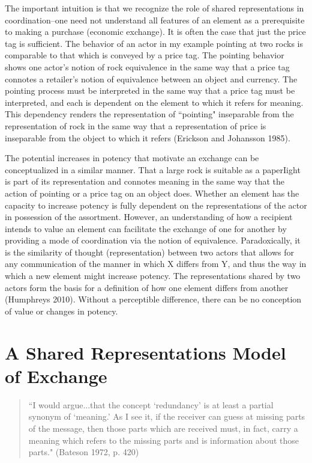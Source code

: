 The important intuition is that we recognize the role of shared representations in coordination--one need not understand all features of an element as a prerequisite to making a purchase (economic exchange). It is often the case that just the price tag is sufficient. The behavior of an actor in my example pointing at two rocks is comparable to that which is conveyed by a price tag. The pointing behavior shows one actor's notion of rock equivalence in the same way that a price tag connotes a retailer's notion of equivalence between an object and currency. The pointing process must be interpreted in the same way that a price tag must be interpreted, and each is dependent on the element to which it refers for meaning. This dependency renders the representation of ``pointing" inseparable from the representation of rock in the same way that a representation of price is inseparable from the object to which it refers (Erickson and Johansson 1985). 

The potential increases in potency that motivate an exchange can be conceptualized in a similar manner. That a large rock is suitable as a paperIight is part of its representation and connotes meaning in the same way that the action of pointing or a price tag on an object does. Whether an element has the capacity to increase potency is fully dependent on the representations of the actor in possession of the assortment. However, an understanding of how a recipient intends to value an element can facilitate the exchange of one for another by providing a mode of coordination via the notion of equivalence. Paradoxically, it is the similarity of thought (representation) between two actors that allows for any communication of the manner in which X differs from Y, and thus the way in which a new element might increase potency. The representations shared by two actors form the basis for a definition of how one element differs from another (Humphreys 2010). Without a perceptible difference, there can be no conception of value or changes in potency. 

\section{A Shared Representations Model of Exchange\label{ent}}
\begin{small}
\begin{quote}
 ``I would argue...that the concept `redundancy' is at least a partial synonym of `meaning.' As I see it, if the receiver can guess at missing parts of the message, then those parts which are received must, in fact, carry a meaning which refers to the missing parts and is information about those parts." (Bateson 1972, p. 420)
 \end{quote}
 \end{small}
 
